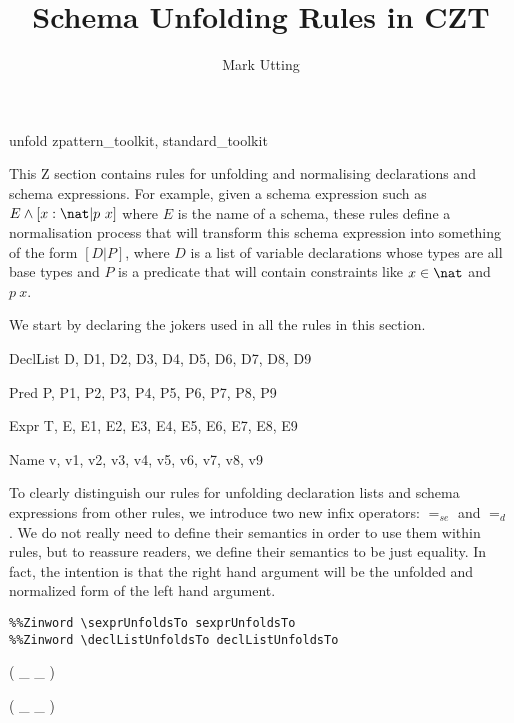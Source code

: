\documentclass{article}
\title{Schema Unfolding Rules in CZT}
\author{Mark Utting}
\newcommand{\sexprUnfoldsTo}{\mathrel{=_{se}}}
\newcommand{\declListUnfoldsTo}{\mathrel{=_d}}
\begin{document}
\maketitle

\begin{zsection}
  \SECTION unfold \parents zpattern\_toolkit, standard\_toolkit
\end{zsection}

This Z section contains rules for unfolding and normalising declarations
and schema expressions.  For example, given a schema expression such as 
$E \land [x:\nat | p~x]$ where $E$ is the name of a schema, these rules
define a normalisation process that will transform this schema expression
into something of the form $[D|P]$, where $D$ is a list of variable
declarations whose types are all base types and $P$ is a predicate that
will contain constraints like $x \in \nat$ and $p~x$.

We start by declaring the jokers used in all the rules in this section.

\begin{zedjoker}{DeclList} D, D1, D2, D3, D4, D5, D6, D7, D8, D9 \end{zedjoker}
\begin{zedjoker}{Pred} P, P1, P2, P3, P4, P5, P6, P7, P8, P9 \end{zedjoker}
\begin{zedjoker}{Expr} T, E, E1, E2, E3, E4, E5, E6, E7, E8, E9 \end{zedjoker}
\begin{zedjoker}{Name} v, v1, v2, v3, v4, v5, v6, v7, v8, v9 \end{zedjoker}

To clearly distinguish our rules for unfolding declaration lists and
schema expressions from other rules, we introduce two new infix
operators: $\sexprUnfoldsTo$ and $\declListUnfoldsTo$.  
We do not really need to define their semantics in order to use them within
rules, but to reassure readers, we define their semantics to be just
equality.  In fact, the intention is that the right hand argument
will be the unfolded and normalized form of the left hand argument.

\begin{verbatim}
%%Zinword \sexprUnfoldsTo sexprUnfoldsTo
%%Zinword \declListUnfoldsTo declListUnfoldsTo
\end{verbatim}

\begin{zed}
  \relation ( \_ \sexprUnfoldsTo \_ )
\end{zed}
\begin{zed}
  \relation ( \_ \declListUnfoldsTo \_ )
\end{zed}
\end{document}
